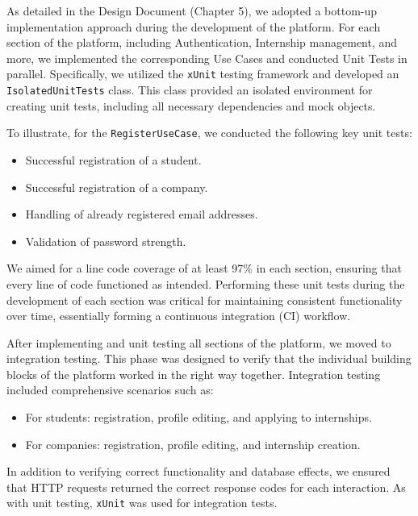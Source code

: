 As detailed in the Design Document (Chapter 5), we adopted a bottom-up implementation approach during the development of the platform. For each section of the platform, including Authentication, Internship management, and more, we implemented the corresponding Use Cases and conducted Unit Tests in parallel. Specifically, we utilized the \texttt{xUnit} testing framework and developed an \texttt{IsolatedUnitTests} class. This class provided an isolated environment for creating unit tests, including all necessary dependencies and mock objects. 

To illustrate, for the \texttt{RegisterUseCase}, we conducted the following key unit tests:
\begin{itemize}
    \item Successful registration of a student.
    \item Successful registration of a company.
    \item Handling of already registered email addresses.
    \item Validation of password strength.
\end{itemize}

We aimed for a line code coverage of at least 97\% in each section, ensuring that every line of code functioned as intended. Performing these unit tests during the development of each section was critical for maintaining consistent functionality over time, essentially forming a continuous integration (CI) workflow.

After implementing and unit testing all sections of the platform, we moved to integration testing. This phase was designed to verify that the individual building blocks of the platform worked in the right way together. Integration testing included comprehensive scenarios such as:
\begin{itemize}
    \item For students: registration, profile editing, and applying to internships.
    \item For companies: registration, profile editing, and internship creation.
\end{itemize}

In addition to verifying correct functionality and database effects, we ensured that HTTP requests returned the correct response codes for each interaction. As with unit testing, \texttt{xUnit} was used for integration tests.

